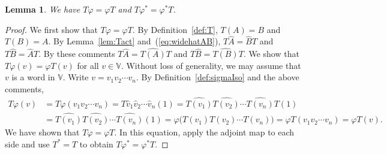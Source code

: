 \documentclass[11pt]{article}
\numberwithin{equation}{section}
\numberwithin{equation}{section}
\newtheorem{Lemma}[Theorem]{Lemma}
\begin{document}
{\begin{Lemma}\label{lem:TT} We have $ T \varphi = \varphi T$ and $ T \varphi^* = \varphi^* T$.
\end{Lemma}
\begin{proof}We first show that $ T \varphi = \varphi T$. By Definition~\ref{def:T}, $T(A)=B$ and $T(B)=A$.
By Lemma~\ref{lem:Tact} and~(\ref{eq:widehatAB}), $T \widehat A = \widehat B T$ and $T \widehat B = \widehat A T$. By these comments $T \widehat A = \widehat {T(A)} T$ and $T \widehat B = \widehat {T(B)} T$.
We show that $ T \varphi (v) = \varphi T (v)$ for all $v \in \mathbb V$. Without loss of generality,
we may assume that $v$ is a word in $\mathbb V$. Write $v=v_1v_2\cdots v_n$. By Definition~\ref{def:sigmaIso} and the above comments,
\begin{align*}
T \varphi (v) &= T \varphi (v_1v_2\cdots v_n) =T \widehat v_1 \widehat v_2\cdots \widehat v_n (1)=
 \widehat {T(v_1)} \widehat {T(v_2)}\cdots \widehat {T(v_n)} T (1) \\
& = \widehat {T(v_1)} \widehat {T(v_2)}\cdots \widehat {T(v_n)} (1)=\varphi \bigl(T(v_1) T(v_2)\cdots T(v_n)\bigr)=\varphi T (v_1v_2\cdots v_n) =\varphi T (v).
\end{align*}
We have shown that $ T \varphi = \varphi T$. In this equation, apply the adjoint map to each side and
use $T^*=T$ to obtain $ T \varphi^* = \varphi^* T$.
\end{proof}

}
\end{document}
